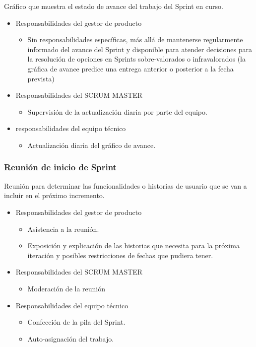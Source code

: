 \hspace*{2em}Gráfico que muestra el estado de avance del trabajo del Sprint en curso.
	\begin{itemize}
		\item Responsabilidades del gestor de producto
		\begin{itemize}
			\item Sin responsabilidades específicas, más allá de mantenerse regularmente informado del avance del Sprint y disponible para atender decisiones para la resolución de opciones en Sprints sobre-valorados o infravalorados (la gráfica de avance predice una entrega anterior o posterior a la fecha prevista)
		\end{itemize}
		\item Responsabilidades del SCRUM MASTER
		\begin{itemize}
			\item Supervisión de la actualización diaria por parte del equipo.
		\end{itemize}		
		\item responsabilidades del equipo técnico
		\begin{itemize}
			\item Actualización diaria del gráfico de avance.
		\end{itemize}
	\end{itemize}	

\subsubsection{Reunión de inicio de Sprint}

\hspace*{2em}Reunión para determinar las funcionalidades o historias de usuario que se van a incluir en el próximo incremento.

	\begin{itemize}
		\item Responsabilidades del gestor de producto
		\begin{itemize}
			\item Asistencia a la reunión.
			\item	Exposición y explicación de las historias que necesita para la próxima iteración y posibles restricciones de fechas que pudiera tener.
		\end{itemize}
		\item Responsabilidades del SCRUM MASTER
		\begin{itemize}
			\item Moderación de la reunión
		\end{itemize}
		\item Responsabilidades del equipo técnico
		\begin{itemize}
			\item	Confección de la pila del Sprint.
			\item	Auto-asignación del trabajo.
		\end{itemize}
	\end{itemize}

